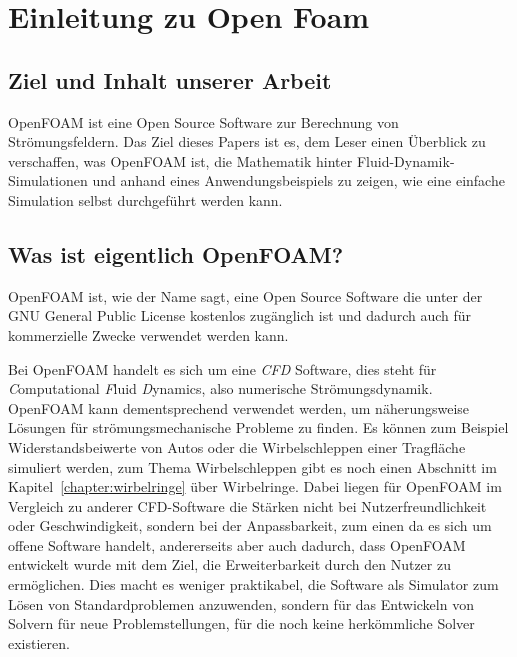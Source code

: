 %
%
%
%
\section{Einleitung zu Open Foam\label{openfoam:section:Einleitung}}

\subsection{Ziel und Inhalt unserer Arbeit}
OpenFOAM ist eine Open Source Software zur Berechnung von Strömungsfeldern. 
%
Das Ziel dieses Papers ist es, dem Leser einen Überblick zu verschaffen, was OpenFOAM ist, die Mathematik hinter Fluid-Dynamik-Simulationen und anhand eines 
%
Anwendungsbeispiels zu zeigen, wie eine einfache Simulation selbst durchgeführt werden kann.


\subsection{Was ist eigentlich OpenFOAM?\label{openfoam:section:WasIstOpenFoam}}
OpenFOAM ist, wie der Name sagt, eine Open Source Software die unter der GNU
%
General Public License kostenlos zugänglich ist und dadurch auch für kommerzielle Zwecke 
%
verwendet werden kann. 

Bei OpenFOAM handelt es sich um eine \emph{CFD} Software, dies steht für \emph{C}omputational \emph{F}luid \emph{D}ynamics, also numerische Strömungsdynamik.
%
OpenFOAM kann dementsprechend verwendet werden, um näherungsweise Lösungen für 
strömungsmechanische Probleme zu finden.
%
Es können zum Beispiel Widerstandsbeiwerte von Autos oder die Wirbelschleppen einer Tragfläche simuliert werden, zum Thema Wirbelschleppen gibt es noch einen Abschnitt im Kapitel~\ref{chapter:wirbelringe} über Wirbelringe.
%
%
Dabei liegen für OpenFOAM im Vergleich zu anderer CFD-Software die Stärken nicht bei Nutzerfreundlichkeit oder Geschwindigkeit, sondern bei der Anpassbarkeit, zum einen da es sich um offene Software handelt, andererseits aber auch dadurch, dass OpenFOAM entwickelt wurde mit dem Ziel, die Erweiterbarkeit durch den Nutzer zu ermöglichen.
%
%
Dies macht es weniger praktikabel, die Software als Simulator zum Lösen von Standardproblemen anzuwenden, sondern für das Entwickeln von Solvern für neue Problemstellungen, für die noch keine herkömmliche Solver existieren.

